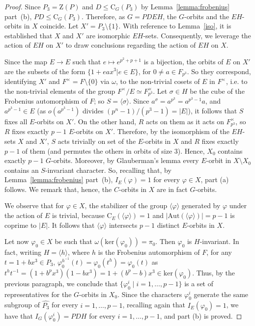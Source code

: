 \documentclass{amsart}
\def\cent#1#2{\mathrm{C}_{{#1}}{{(#2)}}}
\begin{document}
\begin{proof}
Since $P_3 = \mathrm{Z}(P)$ and $D \leq \cent G{P_3}$ by Lemma~\ref{lemma:frobenius} part~(b),  $PD \leq \cent G{P_3}$. Therefore, as $G=PDEH$, the $G$-orbits and the $EH$-orbits in $X$ coincide.
  Let  $X' = P_3 \setminus \{1\}$.
With reference to Lemma~\ref{iso}, it is established that $X$ and $X'$ are isomorphic $EH$-sets. Consequently, we leverage the action of $EH$ on $X'$ to draw conclusions regarding the action of $EH$ on $X$.

Since the map $E \to E$ such that $e \mapsto e^{p^2+p+1}$ is a bijection, the orbits of $E$ on $X'$ are the subsets of the form
$\{1 + ea x^3 | e \in E\}$, for  $0 \neq a \in F_{p^3}$. So  they correspond, identifying   $X'$ and $F^\times = F \setminus \{ 0\}$ via $\omega$,  to
the non-trivial cosets  of $E$ in $F^\times$, i.e. to  the non-trivial elements of the  group $F^\times/E \simeq F_{p^3}^\times$.
Let $\sigma  \in H$ be the cube of the Frobenius automorphism of $F$;   so $S = \langle \sigma \rangle$. Since $a^{\sigma} = a^{p^3} = a^{p^3 -1} a$, and $a^{p^3 -1} \in E$ (as $o(a^{p^3 -1})$ divides $(p^n-1)/(p^3 -1)= |E|$), it follows that $S$ fixes all $E$-orbits on $X'$. On the other hand, $R$ acts on them as it acts on
$F_{p^3}^\times$, so $R$ fixes exactly $p-1$ $E$-orbits on $X'$.
Therefore, by the isomorphism of the $EH$-sets $X$ and $X'$,  $S$ acts trivially on set of the $E$-orbits in
$X$ and $R$ fixes exactly $p-1$ of them (and permutes the others in orbits of size $3$).
Hence,  $X_0$ contains exactly $p-1$ $G$-orbits.
Moreover, by Glauberman's lemma every $E$-orbit in $X \setminus X_0$ contains an
$S$-invariant character.  So, recalling that, by Lemma~\ref{lemma:frobenius} part~(b),  $I_E(\varphi) = 1$ for every
$\varphi \in X$, part (a) follows.
We remark that, hence, the $C$-orbits in $X$ are in fact $G$-orbits.

We observe that for $\varphi \in X$, the stabilizer of the group $\langle\varphi\rangle$ generated by $\varphi$ under the action of  $E$ is trivial,  because $\cent{E}{\langle\varphi\rangle}=1$
and $|\mathrm{Aut}(\langle \varphi \rangle)| = p-1$ is coprime to  $|E|$.
It follows that $\langle \varphi \rangle$ intersects $p-1$ distinct $E$-orbits in $X$.

Let now $\varphi_0 \in X$ be such that $\omega(\mathrm{ker}(\varphi_0)) = \pi_0$. Then $\varphi_0$ is $H$-invariant.
In fact, writing $H = \langle h \rangle$, where $h$ is the Frobenius automorphism of $F$,  for any $t = 1 +b x^3 \in P_3$,
$\varphi_0^{h^{-1}}(t) = \varphi_0(t^h) = \varphi_0(t)$ as $t^ht^{-1} = (1+b^p x^3)(1 - b x^3) = 1+ (b^p - b)x^3 \in
\mathrm{ker}(\varphi_0)$. Thus, by the previous paragraph, we conclude that $\{ \varphi_0^i \mid i = 1, \ldots, p-1\}$
is a set of representatives  for the $G$-orbits in $X_0$. Since the characters $\varphi_0^i$ generate the same
subgroup of $\widehat{P_3}$ for every $i = 1, \ldots, p-1$, recalling again that $I_E(\varphi_0) = 1$, we have
that $I_G(\varphi_0^i) = PDH$ for every $i = 1, \ldots, p-1$, and part (b) is proved.


\end{proof}
\end{document}
